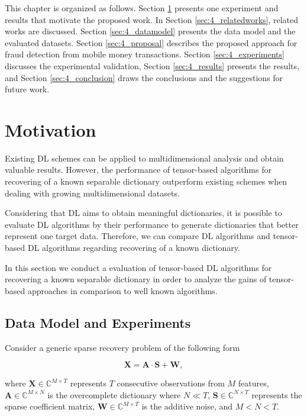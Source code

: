 This chapter is organized as follows. Section \ref{sec:4_motivation} presents one experiment and results that motivate the proposed work. In Section \ref{sec:4_relatedworks}, related works are discussed. Section \ref{sec:4_datamodel} presents the data model and the evaluated datasets. Section \ref{sec:4_proposal} describes the proposed approach for fraud detection from mobile money transactions. Section \ref{sec:4_experiments} discusses the experimental validation, Section \ref{sec:4_results} presents the results, and Section \ref{sec:4_conclusion} draws the conclusions and the suggestions for future work.


\section{Motivation}
\label{sec:4_motivation}

Existing DL schemes can be applied to multidimensional analysis and obtain valuable results. However, the performance of tensor-based algorithms for recovering of a known separable dictionary outperform existing schemes when dealing with growing multidimensional datasets.

Considering that DL aims to obtain meaningful dictionaries, it is possible to evaluate DL algorithms by their performance to generate dictionaries that better represent one target data. Therefore, we can compare DL algorithms and tensor-based DL algorithms regarding recovering of a known dictionary. 

In this section we conduct a evaluation of tensor-based DL algorithms for recovering a known separable dictionary in order to analyze the gains of tensor-based approaches in comparison to well known algorithms.

\subsection{Data Model and Experiments}
\label{sec:4_motivation_datamodel}

Consider a generic sparse recovery problem of the following form

\begin{equation}\label{eq:4_eq01}
	\textbf{X} = \textbf{A} \cdot \textbf{S} + \textbf{W},
\end{equation}

where $\textbf{X} \in \mathbb{C}^{M \times T}$ represents $T$ consecutive observations from $M$ features, $\textbf{A} \in \mathbb{C}^{M \times N}$ is the overcomplete dictionary where $N \ll T$, $\textbf{S} \in \mathbb{C}^{N \times T}$ represents the sparse coefficient matrix, $\textbf{W} \in \mathbb{C}^{M \times T}$ is the additive noise, and $M < N < T$.

